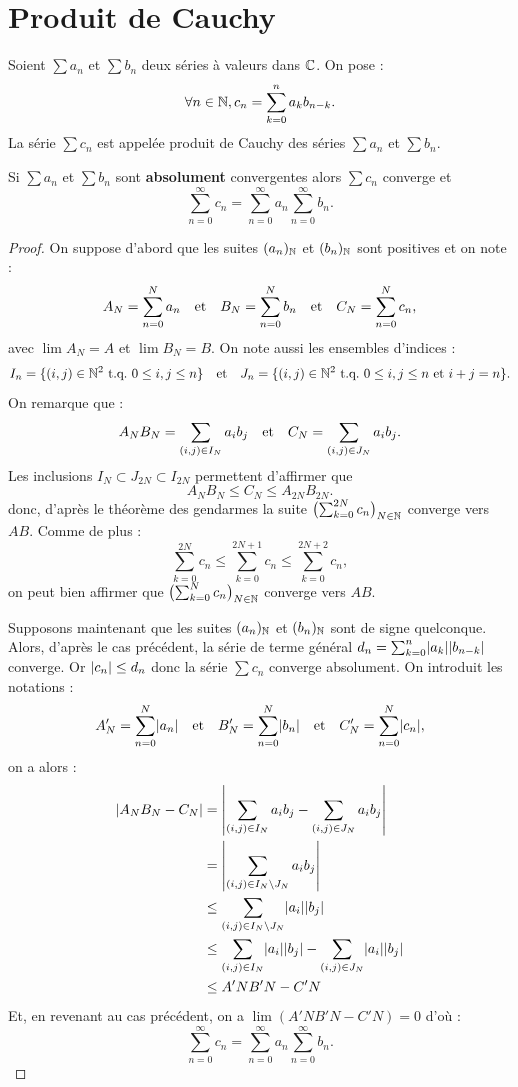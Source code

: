 \documentclass[french]{article}
\begin{document}
\section{Produit de Cauchy}

\begin{defn}
Soient $\sum a_n$ et $\sum b_n$ deux séries à valeurs dans $\Cx$. On pose :
\[ \forall n \in \N, c_n = \sum_{k=0}^n a_k b_{n-k} . \]
La série $\sum c_n$ est appelée produit de Cauchy des séries $\sum a_n$ et $\sum b_n$.
\end{defn}

\begin{thm}
Si $\sum a_n$ et $\sum b_n$ sont \textbf{absolument} convergentes alors $\sum c_n$ converge et 
\[ \sum_{n=0}^{\infty} c_n = \sum_{n=0}^{\infty} a_n \sum_{n=0}^{\infty} b_{n} . \]
\end{thm}

\begin{proof}
On suppose d'abord que les suites $(a_n)_\N$ et $(b_n)_\N$ sont positives et on note :
\[ A_N = \sum_{n=0}^{N} a_n \et B_N = \sum_{n=0}^{N} b_n \et C_N = \sum_{n=0}^{N} c_n , \]
avec $\lim A_N = A$ et $\lim B_N = B$. On note aussi les ensembles d'indices :
\[ I_n = \set{ (i,j) \in \N^2 \tq 0 \leq i, j \leq n} \et J_n = \set{ (i,j) \in \N^2 \tq 0 \leq i, j \leq n \text{ et } i+j = n} . \]
On remarque que :
\[ A_N B_N = \sum_{(i,j) \in I_N} a_i b_j  \et C_N = \sum_{(i,j) \in J_N} a_i b_j . \]
Les inclusions $I_N \subset J_{2N} \subset I_{2N}$ permettent d'affirmer que  
\[ A_N B_N \leq C_N \leq A_{2N} B_{2N} . \]
donc, d'après le théorème des gendarmes la suite $\bigpar{\sum_{k=0}^{2N} c_n}_{N \in \N}$ converge vers $AB$.
Comme de plus :
\[ \sum_{k=0}^{2N} c_n \leq \sum_{k=0}^{2N+1} c_n \leq \sum_{k=0}^{2N+2} c_n, \]
on peut bien affirmer que $\bigpar{\sum_{k=0}^{N} c_n}_{N \in \N}$ converge vers $AB$. \newline

Supposons maintenant que les suites $(a_n)_\N$ et $(b_n)_\N$ sont de signe quelconque. Alors, d'après le cas précédent, la série
de terme général $d_n = \sum_{k=0}^n \abs{a_k} \abs{b_{n-k}}$ converge. 
Or $\abs{c_n} \leq d_n$ donc la série $\sum c_n$ converge absolument.
On introduit les notations :
\[ A'_N = \sum_{n=0}^{N} \abs{a_n} \et B'_N = \sum_{n=0}^{N} \abs{b_n} \et C'_N = \sum_{n=0}^{N} \abs{c_n} , \]
on a alors :
\begin{align*}
\abs{A_N B_N - C_N} & = \abs*{\sum_{(i,j) \in I_N} a_i b_j - \sum_{(i,j) \in J_N} a_i b_j} \\
& = \abs*{\sum_{(i,j) \in I_N \setminus J_N} a_i b_j} \\
& \leq \sum_{(i,j) \in I_N \setminus J_N} \abs{a_i} \abs{b_j} \\
& \leq \sum_{(i,j) \in I_N} \abs{a_i} \abs{b_j} - \sum_{(i,j) \in J_N} \abs{a_i} \abs{b_j} \\
& \leq A'N B'N - C'N
\end{align*}
Et, en revenant au cas précédent, on a $\lim (A'N B'N - C'N) = 0$ d'où :
\[ \sum_{n=0}^{\infty} c_n = \sum_{n=0}^{\infty} a_n \sum_{n=0}^{\infty} b_{n} . \]
\end{proof}
\end{document}
